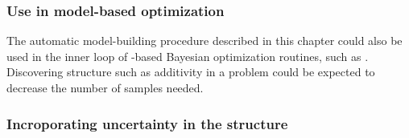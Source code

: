 \subsubsection{Use in model-based optimization}
The automatic model-building procedure described in this chapter could also be used in the inner loop of \gp{}-based Bayesian optimization routines, such as \citet{snoek2012practical}.
Discovering structure such as additivity in a problem could be expected to decrease the number of samples needed.


\subsubsection{Incroporating uncertainty in the structure}
\fi


\outbpdocument{


}

